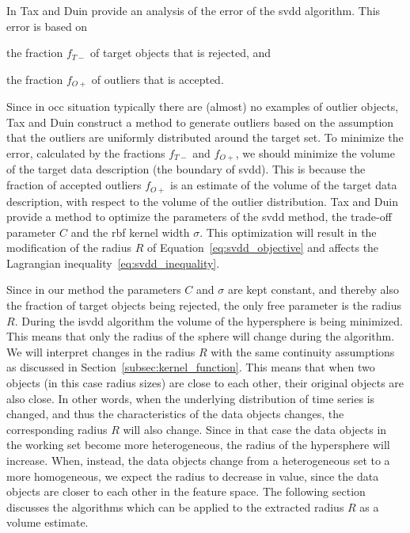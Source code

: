 In \cite{tax2002uniform} Tax and Duin provide an analysis of the error of the \gls{svdd} algorithm.
This error is based on
\begin{inparaenum}[\itshape 1\upshape)]
\item the fraction $f_{T-}$ of target objects that is rejected, and
\item the fraction $f_{O+}$ of outliers that is accepted.
\end{inparaenum}
Since in \gls{occ} situation typically there are (almost) no examples of outlier objects, Tax and Duin construct a method to generate outliers based on the assumption that the outliers are uniformly distributed around the target set.
To minimize the error, calculated by the fractions $f_{T-}$ and $f_{O+}$, we should minimize the volume of the target data description (\ie the boundary of \gls{svdd}).
This is because the fraction of accepted outliers $f_{O+}$ is an estimate of the volume of the target data description, with respect to the volume of the outlier distribution.
Tax and Duin provide a method to optimize the parameters of the \gls{svdd} method, \ie the trade-off parameter $C$ and the \gls{rbf} kernel width $\sigma$.
This optimization will result in the modification of the radius $R$ of Equation~\ref{eq:svdd_objective} and affects the Lagrangian inequality~\ref{eq:svdd_inequality}.

Since in our method the parameters $C$ and $\sigma$ are kept constant, and thereby also the fraction of target objects being rejected, the only free parameter is the radius $R$.
During the \gls{isvdd} algorithm the volume of the hypersphere is being minimized.
This means that only the radius of the sphere will change during the algorithm.
We will interpret changes in the radius $R$ with the same continuity assumptions as discussed in Section~\ref{subsec:kernel_function}.
This means that when two objects (in this case radius sizes) are close to each other, their original objects are also close.
In other words, when the underlying distribution of time series is changed, and thus the characteristics of the data objects changes, the corresponding radius $R$ will also change.
Since in that case the data objects in the working set become more heterogeneous, the radius of the hypersphere will increase.
When, instead, the data objects change from a heterogeneous set to a more homogeneous, we expect the radius to decrease in value, since the data objects are closer to each other in the feature space.
The following section discusses the algorithms which can be applied to the extracted radius $R$ as a volume estimate.

